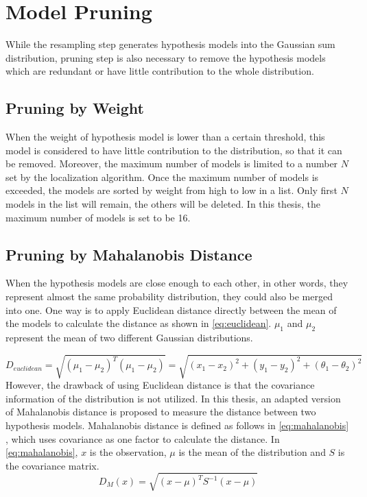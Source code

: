 \section{Model Pruning}\label{sec:pruning}
While the resampling step generates hypothesis models into the Gaussian sum distribution, pruning step is also necessary to remove the hypothesis models which are redundant or have little contribution to the whole distribution.

\subsection{Pruning by Weight}
\label{sub:Pruning by Weight}
When the weight of hypothesis model is lower than a certain threshold, this model is considered to have little contribution to the distribution, so that it can be removed. Moreover, the maximum number of models is limited to a number $N$ set by the localization algorithm. Once the maximum number of models is exceeded, the models are sorted by weight from high to low in a list. Only first $N$ models in the list will remain, the others will be deleted. In this thesis, the maximum number of models is set to be 16.

\subsection[Merging by Mahalanobis Distance]{Pruning by Mahalanobis Distance }
\label{sub:Prunning Mahalanobis Distance}
When the hypothesis models are close enough to each other, in other words, they represent almost the same probability distribution, they could also be merged into one. One way is to apply Euclidean distance directly between the mean of the models to calculate the distance as shown in \autoref{eq:euclidean}. $\mu_1$ and $\mu_2$ represent the mean of two different Gaussian distributions.

\begin{equation}
\label{eq:euclidean}
D_{euclidean} = \sqrt{(\mu_1 - \mu_2)^T(\mu_1 - \mu_2)}= \sqrt{(x_{1}-x_{2})^2 + (y_{1}-y_{2})^2 + (\theta_{1}-\theta_{2})^2}
\end{equation}
However, the drawback of using Euclidean distance is that the covariance information of the distribution is not utilized. In this thesis, an adapted version of Mahalanobis distance  is proposed to measure the distance between two hypothesis models. Mahalanobis distance is defined as follows in \autoref{eq:mahalanobis} \cite{de2000mahalanobis}, which uses covariance as one factor to calculate the distance. In \autoref{eq:mahalanobis}, $x$ is the observation, $\mu$ is the mean of the distribution and $S$ is the covariance matrix.
\begin{equation}
\label{eq:mahalanobis}
D_M(x) = \sqrt{(x - \mu)^T S^{-1} (x-\mu)}
\end{equation}

